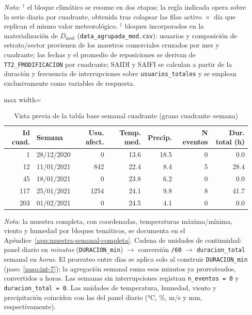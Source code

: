 \begin{table}[!htbp]
    \noindent\textit{Nota:} $^{\dagger}$ el bloque climático se resume en dos etapas; la regla indicada opera sobre la serie diaria por cuadrante, obtenida tras colapsar las filas activo~$\times$~día que replican el mismo valor meteorológico. $^{\ddagger}$ bloques incorporados en la materialización de $D_{\mathrm{mod}}$ (\texttt{data\_agrupada\_mod.csv}): usuarios y composición de estrato/sector provienen de los maestros comerciales cruzados por mes y cuadrante; las fechas y el promedio de reposiciones se derivan de \texttt{TT2\_FMODIFICACION} por cuadrante; SAIDI y SAIFI se calculan a partir de la duración y frecuencia de interrupciones sobre \texttt{usuarios\_totales} y se emplean exclusivamente como variables de respuesta.
    \end{table}
    
    \begin{table}[!htbp]
    \centering
    \small
    \caption{Vista previa de la tabla base semanal cuadrante (grano cuadrante--semana)}
    \label{tab:muestra_semanal_preview}
    \begin{adjustbox}{max width=\linewidth}
\begin{tabular}{r l r r r r r}
    \toprule
    \textbf{Id cuad.} & \textbf{Semana} & \textbf{Usu. afect.} & \textbf{Temp. med.} & \textbf{Precip.} & \textbf{N eventos} & \textbf{Dur. total (h)} \\
    \midrule
      1 & 28/12/2020 &    0 & 13.6 & 18.5 & 0 &  0.0 \\
     12 & 11/01/2021 &  842 & 22.4 &  8.4 & 5 & 28.4 \\
     45 & 18/01/2021 &    0 & 23.8 &  6.2 & 0 &  0.0 \\
    117 & 25/01/2021 & 1254 & 24.1 &  9.8 & 8 & 41.7 \\
    203 & 01/02/2021 &    0 & 24.5 &  4.1 & 0 &  0.0 \\
    \bottomrule
    \end{tabular}
\end{adjustbox}
    \end{table}

    \noindent\textit{Nota:} la muestra completa, con coordenadas, temperaturas máxima/mínima, viento y humedad por bloques temáticos, se documenta en el Apéndice~\ref{app:muestra-semanal-completa}. Cadena de unidades de continuidad: panel diario en \textit{minutos} (\texttt{DURACION\_min}) $\rightarrow$ conversión \texttt{/60} $\rightarrow$ \texttt{duracion\_total} semanal en \textit{horas}. El prorrateo entre días se aplica solo al construir \texttt{DURACION\_min} (paso~\ref{paso:int-7}); la agregación semanal suma esos minutos ya prorrateados, convertidos a horas. Las semanas sin interrupciones registran \texttt{n\_eventos = 0} y \texttt{duracion\_total = 0}. Las unidades de temperatura, humedad, viento y precipitación coinciden con las del panel diario (°C, \%, m/s y mm, respectivamente).

